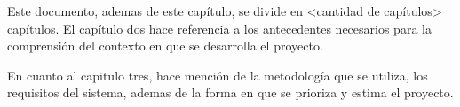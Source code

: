 Este documento, ademas de este capítulo, se divide en <cantidad de capítulos> capítulos. El capítulo dos hace referencia a los antecedentes necesarios para la comprensión del contexto en que se desarrolla el proyecto.

En cuanto al capitulo tres, hace mención de la metodología que se utiliza, los requisitos del sistema, ademas de la forma en que se prioriza y estima el proyecto.

